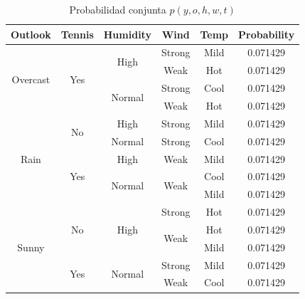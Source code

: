 \documentclass[11pt]{article}
\begin{document}
\begin{table}[h]
\centering
\begin{tabular}{c|c|c|c|c||c}
Outlook                   & Tennis               & Humidity                & Wind                  & Temp & Probability \\ \hline \hline
\multirow{4}{*}{Overcast} & \multirow{4}{*}{Yes} & \multirow{2}{*}{High}   & Strong                & Mild & 0.071429    \\ \cline{4-6} 
                          &                      &                         & Weak                  & Hot  & 0.071429    \\ \cline{3-6} 
                          &                      & \multirow{2}{*}{Normal} & Strong                & Cool & 0.071429    \\ \cline{4-6} 
                          &                      &                         & Weak                  & Hot  & 0.071429    \\ \hline
\multirow{5}{*}{Rain}     & \multirow{2}{*}{No}  & High                    & Strong                & Mild & 0.071429    \\ \cline{3-6} 
                          &                      & Normal                  & Strong                & Cool & 0.071429    \\ \cline{2-6} 
                          & \multirow{3}{*}{Yes} & High                    & Weak                  & Mild & 0.071429    \\ \cline{3-6} 
                          &                      & \multirow{2}{*}{Normal} & \multirow{2}{*}{Weak} & Cool & 0.071429    \\ \cline{5-6} 
                          &                      &                         &                       & Mild & 0.071429    \\ \hline
\multirow{5}{*}{Sunny}    & \multirow{3}{*}{No}  & \multirow{3}{*}{High}   & Strong                & Hot  & 0.071429    \\ \cline{4-6} 
                          &                      &                         & \multirow{2}{*}{Weak} & Hot  & 0.071429    \\ \cline{5-6} 
                          &                      &                         &                       & Mild & 0.071429    \\ \cline{2-6} 
                          & \multirow{2}{*}{Yes} & \multirow{2}{*}{Normal} & Strong                & Mild & 0.071429    \\ \cline{4-6} 
                          &                      &                         & Weak                  & Cool & 0.071429   

    \end{tabular}
    \caption{Probabilidad conjunta $p(y,o,h,w,t)$}
    \label{tab:joint_proba_yohwt}
\end{table}
\end{document}
